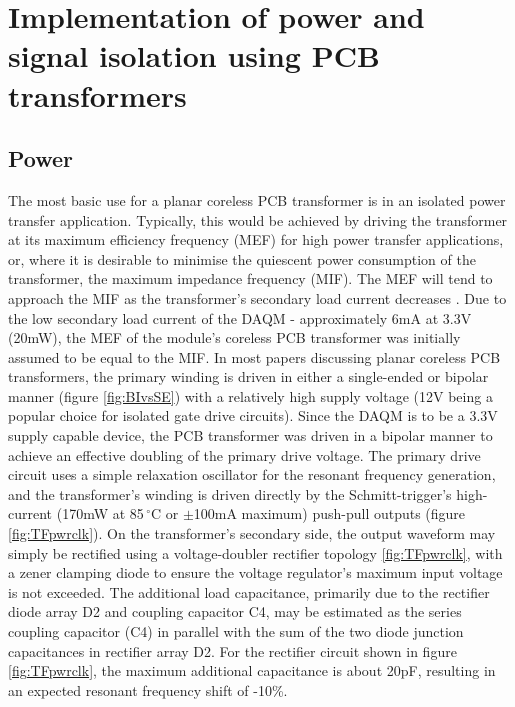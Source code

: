 \documentclass[conference]{IEEEtran}
\begin{document}
\section{Implementation of power and signal isolation using PCB transformers}

	\subsection{Power}
	The most basic use for a planar coreless PCB transformer is in an isolated power transfer application.  Typically, this would be achieved by driving the transformer at its maximum efficiency frequency (MEF) for high power transfer applications, or, where it is desirable to minimise the quiescent power consumption of the transformer, the maximum impedance frequency (MIF).  The MEF will tend to approach the MIF as the transformer's secondary load current decreases \cite{TangHuiFundamental}.  
	Due to the low secondary load current of the DAQM - approximately 6mA at 3.3V (20mW), the MEF of the module's coreless PCB transformer was initially assumed to be equal to the MIF.  In most papers discussing planar coreless PCB transformers, the primary winding is driven in either a single-ended or bipolar manner (figure \ref{fig:BIvsSE}) with a relatively high supply voltage (12V being a popular choice for isolated gate drive circuits).  Since the DAQM is to be a 3.3V supply capable device, the PCB transformer was driven in a bipolar manner to achieve an effective doubling of the primary drive voltage.  The primary drive circuit uses a simple relaxation oscillator for the resonant frequency generation, and the transformer's winding is driven directly by the Schmitt-trigger's high-current (170mW at 85$ \,^{\circ} $C or $\pm$100mA maximum) push-pull outputs (figure \ref{fig:TFpwrclk}).
	On the transformer's secondary side, the output waveform may simply be rectified using a voltage-doubler rectifier topology \ref{fig:TFpwrclk}, with a zener clamping diode to ensure the voltage regulator's maximum input voltage is not exceeded.  The additional load capacitance, primarily due to the rectifier diode array D2 and coupling capacitor C4, may be estimated as the series coupling capacitor (C4) in parallel with the sum of the two diode junction capacitances in rectifier array D2.  For the rectifier circuit shown in figure \ref{fig:TFpwrclk}, the maximum additional capacitance is about 20pF, resulting in an expected resonant frequency shift of -10\%.
	
\end{document}
